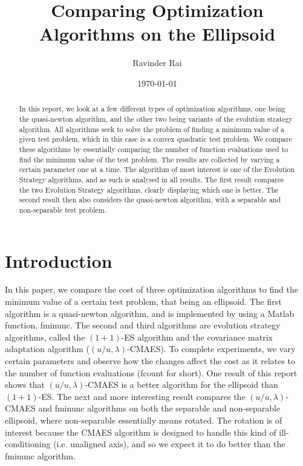 \documentclass[sigconf, 6pt]{acmart}
\title{\textbf{Comparing Optimization Algorithms on the Ellipsoid}}
\author{Ravinder Rai}
\date{\today}
\begin{document}
 


\begin{abstract}
In this report, we look at a few different types of optimization algorithms, one being the quasi-newton algorithm, and the other two being variants of the evolution strategy algorithm. All algorithms seek to solve the problem of finding a minimum value of a given test problem, which in this case is a convex quadratic test problem. We compare these algorithms by essentially comparing the number of function evaluations used to find the minimum value of the test problem. The results are collected by varying a certain parameter one at a time. The algorithm of most interest is one of the Evolution Strategy algorithms, and as such is analysed in all results. The first result compares the two Evolution Strategy algorithms, clearly displaying which one is better. The second result then also considers the quasi-newton algorithm, with a separable and non-separable test problem.
\end{abstract}
\maketitle

\section{Introduction}
\label{sec:intro}

In this paper, we compare the cost of three optimization algorithms to find the minimum value of a certain test problem, that being an ellipsoid. The first algorithm is a quasi-newton algorithm, and is implemented by using a Matlab function, fminunc. The second and third algorithms are evolution strategy algorithms, called the $(1+1)$-ES algorithm and the covariance matrix adaptation algorithm ($(u/u,\lambda)$-CMAES). To complete experiments, we vary certain parameters and observe how the changes affect the cost as it relates to the number of function evaluations (fcount for short). One result of this report shows that $(u/u,\lambda)$-CMAES is a better algorithm for the ellipsoid than $(1+1)$-ES. The next and more interesting result compares the $(u/u,\lambda)$-CMAES and fminunc algorithms on both the separable and non-separable ellipsoid, where non-separable essentially means rotated. The rotation is of interest because the CMAES algorithm is designed to handle this kind of ill-conditioning (i.e. unaligned axis), and so we expect it to do better than the fminunc algorithm.
\end{document}
